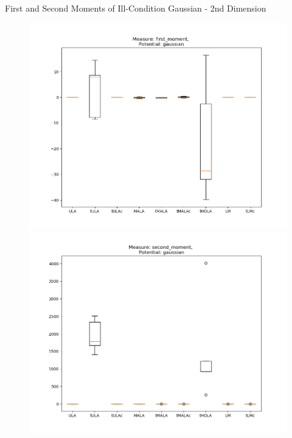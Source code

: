 \documentclass[aspectratio=169]{beamer}
\begin{document}
\begin{frame}{First and Second Moments of Ill-Condition Gaussian - 2nd Dimension}%
        \begin{figure}[h]
        \centering
        \begin{minipage}{0.5\linewidth}
          \centering
          \includegraphics[width=0.99\linewidth]{illcond10sBoxPlot1moment100dim01step2nddim.png}
        \end{minipage}%
        \begin{minipage}{0.5\linewidth}
          \centering
          \includegraphics[width=0.99\linewidth]{illcond10sBoxPlot2moment100dim01step2nddim.png}
        \end{minipage}%
        \end{figure}
\end{frame}
\end{document}
